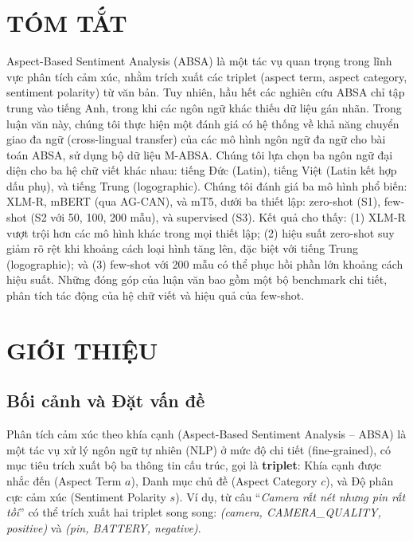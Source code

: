 \documentclass[12pt,a4paper,oneside]{report}
\begin{document}
\chapter*{TÓM TẮT}
Aspect-Based Sentiment Analysis (ABSA) là một tác vụ quan trọng trong lĩnh vực phân tích cảm xúc, nhằm trích xuất các triplet (aspect term, aspect category, sentiment polarity) từ văn bản. Tuy nhiên, hầu hết các nghiên cứu ABSA chỉ tập trung vào tiếng Anh, trong khi các ngôn ngữ khác thiếu dữ liệu gán nhãn. Trong luận văn này, chúng tôi thực hiện một đánh giá có hệ thống về khả năng chuyển giao đa ngữ (cross-lingual transfer) của các mô hình ngôn ngữ đa ngữ cho bài toán ABSA, sử dụng bộ dữ liệu M-ABSA. Chúng tôi lựa chọn ba ngôn ngữ đại diện cho ba hệ chữ viết khác nhau: tiếng Đức (Latin), tiếng Việt (Latin kết hợp dấu phụ), và tiếng Trung (logographic). Chúng tôi đánh giá ba mô hình phổ biến: XLM-R, mBERT (qua AG-CAN), và mT5, dưới ba thiết lập: zero-shot (S1), few-shot (S2 với 50, 100, 200 mẫu), và supervised (S3). Kết quả cho thấy: (1) XLM-R vượt trội hơn các mô hình khác trong mọi thiết lập; (2) hiệu suất zero-shot suy giảm rõ rệt khi khoảng cách loại hình tăng lên, đặc biệt với tiếng Trung (logographic); và (3) few-shot với 200 mẫu có thể phục hồi phần lớn khoảng cách hiệu suất. Những đóng góp của luận văn bao gồm một bộ benchmark chi tiết, phân tích tác động của hệ chữ viết và hiệu quả của few-shot.

\tableofcontents
\listoffigures
\listoftables

\clearpage
{}
\chapter{GIỚI THIỆU}

\section{Bối cảnh và Đặt vấn đề}

Phân tích cảm xúc theo khía cạnh (Aspect-Based Sentiment Analysis -- ABSA) là một tác vụ xử lý ngôn ngữ tự nhiên (NLP) ở mức độ chi tiết (fine-grained), có mục tiêu trích xuất bộ ba thông tin cấu trúc, gọi là \textbf{triplet}: Khía cạnh được nhắc đến (Aspect Term $a$), Danh mục chủ đề (Aspect Category $c$), và Độ phân cực cảm xúc (Sentiment Polarity $s$). Ví dụ, từ câu ``\textit{Camera rất nét nhưng pin rất tồi}'' có thể trích xuất hai triplet song song: \textit{(camera, CAMERA\_QUALITY, positive)} và \textit{(pin, BATTERY, negative)}.
\end{document}
